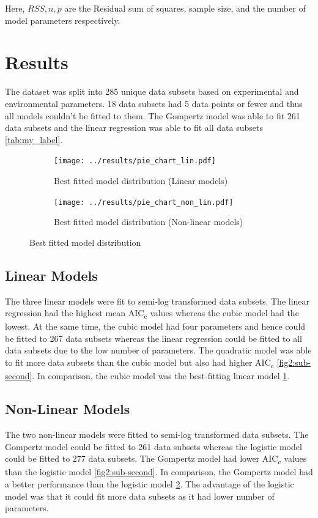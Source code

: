 \documentclass[11pt]{article}
\begin{document}
Here, $RSS, n, p$ are the Residual sum of squares, sample size, and the number of model parameters respectively. 

\section{Results}

The dataset was split into 285 unique data subsets based on experimental and environmental parameters. 18 data subsets had 5 data points or fewer and thus all models couldn't be fitted to them. The Gompertz model was able to fit 261 data subsets and the linear regression was able to fit all data subsets \ref{tab:my_label}.

\begin{figure}[!ht]
\begin{subfigure}{.45\textwidth}
  \centering
  \texttt{[image: ../results/pie\_chart\_lin.pdf]}
  \caption{Best fitted model distribution (Linear models)}
  \label{fig1:sub-first}
\end{subfigure}
\begin{subfigure}{.45\textwidth}
  \centering
  \texttt{[image: ../results/pie\_chart\_non\_lin.pdf]}  
  \caption{Best fitted model distribution (Non-linear models)}
  \label{fig1:sub-second}
\end{subfigure}
\caption{Best fitted model distribution}
\label{fig:fig1}
\end{figure}

\subsection{Linear Models}
The three linear models were fit to semi-log transformed data subsets. The linear regression had the highest mean AIC\textsubscript{c} values whereas the cubic model had the lowest. At the same time, the cubic model had four parameters and hence could be fitted to 267 data subsets whereas the linear regression could be fitted to all data subsets due to the low number of parameters. The quadratic model was able to fit more data subsets than the cubic model but also had higher AIC\textsubscript{c} \ref{fig2:sub-second}. In comparison, the cubic model was the best-fitting linear model \ref{fig1:sub-first}. 

\subsection{Non-Linear Models}
The two non-linear models were fitted to semi-log transformed data subsets. The Gompertz model could be fitted to 261 data subsets whereas the logistic model could be fitted to 277 data subsets. The Gompertz model had lower AIC\textsubscript{c} values than the logistic model \ref{fig2:sub-second}. In comparison, the Gompertz model had a better performance than the logistic model \ref{fig1:sub-second}. The advantage of the logistic model was that it could fit more data subsets as it had lower number of parameters. 
\end{document}
